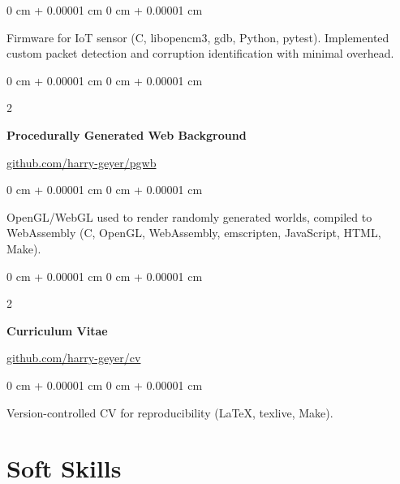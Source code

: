 \documentclass[10pt, letterpaper]{article}
\newenvironment{onecolentry}{
    \begin{adjustwidth}{
        0 cm + 0.00001 cm
    }{
        0 cm + 0.00001 cm
    }
}{
    \end{adjustwidth}
}
\newenvironment{twocolentry}[2][]{
    \onecolentry
    \def\secondColumn{#2}
    \setcolumnwidth{\fill, 4.75 cm}
    \begin{paracol}{2}
}{
    \switchcolumn \raggedleft \secondColumn
    \end{paracol}
    \endonecolentry
}
\begin{document}
        \vspace{0.10 cm}
        \begin{onecolentry}
            Firmware for IoT sensor (C, libopencm3, gdb, Python, pytest). Implemented custom packet detection and corruption identification with minimal overhead.
        \end{onecolentry}

        \vspace{0.2 cm}

        \begin{twocolentry}{\href{https://github.com/harry-geyer/pgwb}{github.com/harry-geyer/pgwb}}
            \textbf{Procedurally Generated Web Background}
        \end{twocolentry}

        \vspace{0.10 cm}
        \begin{onecolentry}
            OpenGL/WebGL used to render randomly generated worlds, compiled to WebAssembly (C, OpenGL, WebAssembly, emscripten, JavaScript, HTML, Make).
        \end{onecolentry}

        \vspace{0.2 cm}


        \begin{twocolentry}{\href{https://github.com/harry-geyer/cv}{github.com/harry-geyer/cv}}
            \textbf{Curriculum Vitae}
        \end{twocolentry}

        \vspace{0.10 cm}
        \begin{onecolentry}
            Version-controlled CV for reproducibility (LaTeX, texlive, Make).
        \end{onecolentry}

    \section{Soft Skills}
\end{document}
